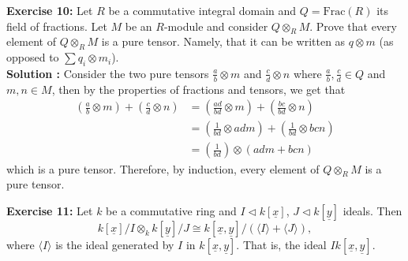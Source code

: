 \documentclass{article}
\newcommand{\isomorphic}{\cong}
\begin{document}
\noindent \textbf{Exercise 10:} Let $R$ be a commutative integral domain and $Q = \text{Frac}(R)$ its field of fractions. Let $M$ be an $R$-module and consider $Q \otimes_R M$. Prove that every element of $Q \otimes_R M$ is a pure tensor. Namely, that it can be written as $q \otimes m$ (as opposed to $\sum q_i \otimes m_i$). \\

\noindent \textbf{Solution :} Consider the two pure tensors $\frac{a}{b}\otimes m$ and $\frac{c}{d} \otimes n$ where $\frac{a}{b}, \frac{c}{d} \in Q$ and $m,n \in M$, then by the properties of fractions and tensors, we get that
\begin{align*}
    \left(\frac{a}{b}\otimes m\right) + \left(\frac{c}{d} \otimes n\right) &= \left(\frac{ad}{bd}\otimes m\right) + \left(\frac{bc}{bd} \otimes n\right) \\
    &= \left(\frac{1}{bd}\otimes adm\right) + \left(\frac{1}{bd} \otimes bcn\right) \\
    &= \left(\frac{1}{bd}\right) \otimes (adm + bcn)
\end{align*}
which is a pure tensor. Therefore, by induction, every element of $Q \otimes_R M$ is a pure tensor.

\newpage

\noindent \textbf{Exercise 11:} Let $k$ be a commutative ring and $I \triangleleft k[\underline{x}]$, $J \triangleleft k[\underline{y}]$ ideals. Then
$$k[\underline{x}]/I \otimes_k k[\underline{y}]/J \isomorphic k[\underline{x}, \underline{y}] / (\langle I \rangle + \langle J \rangle),$$
where $\langle I \rangle$ is the ideal generated by $I$ in $k[\underline{x}, \underline{y}]$. That is, the ideal $Ik[\underline{x}, \underline{y}]$. \\
\end{document}
